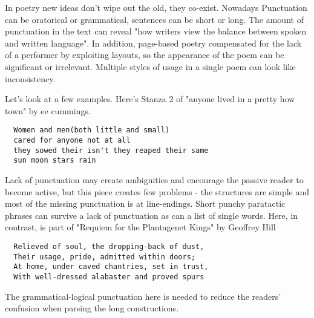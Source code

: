 \documentclass[11pt]{article}
\begin{document}
In poetry new ideas don't wipe out the old, they co-exist. Nowadays Punctuation can be oratorical or
grammatical, sentences can be short or long. The amount of punctuation in the text can reveal "how writers view the balance between spoken and written language". In addition, page-based poetry compensated for the lack of a performer by exploiting layouts, so the appearance of the poem can be significant or irrelevant. Multiple styles of usage in a single poem can look
like inconsistency.

Let's look at a few examples. Here's  Stanza 2 of "anyone lived in a pretty  how town" by ee cummings.
\begin{verbatim}
  Women and men(both little and small)
  cared for anyone not at all
  they sowed their isn't they reaped their same
  sun moon stars rain
\end{verbatim}

Lack of punctuation may create ambiguities and encourage the passive reader to become active, but this piece creates few problems - the structures are simple and most of the missing punctuation is at line-endings. Short punchy paratactic phrases can survive a lack of punctuation as can a list of single words. Here, in contrast, is part of "Requiem for the Plantagenet Kings" by Geoffrey Hill
\begin{verbatim}
  Relieved of soul, the dropping-back of dust,
  Their usage, pride, admitted within doors;
  At home, under caved chantries, set in trust,
  With well-dressed alabaster and proved spurs
\end{verbatim}

The grammatical-logical punctuation here is needed to reduce the readers' confusion when parsing the long constructions.
\end{document}
